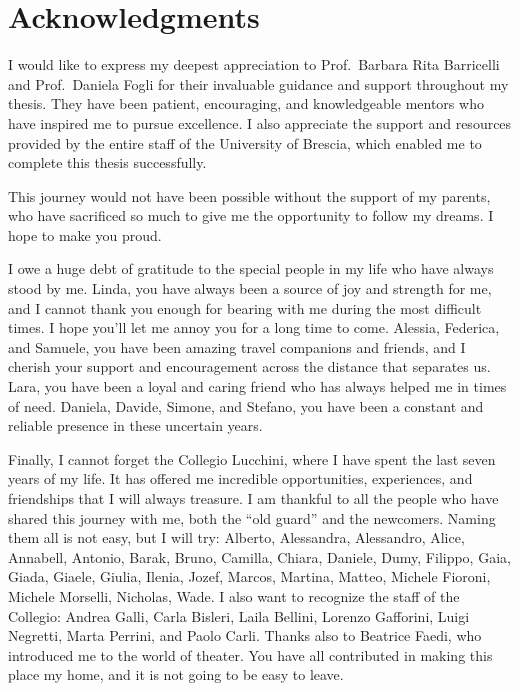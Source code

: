 \chapter*{Acknowledgments}\label{ch:acknowledgments}

I would like to express my deepest appreciation to Prof.\ Barbara Rita Barricelli and Prof.\ Daniela Fogli for their invaluable guidance and support throughout my thesis. They have been patient, encouraging, and knowledgeable mentors who have inspired me to pursue excellence. I also appreciate the support and resources provided by the entire staff of the University of Brescia, which enabled me to complete this thesis successfully.

This journey would not have been possible without the support of my parents, who have sacrificed so much to give me the opportunity to follow my dreams. I hope to make you proud.

I owe a huge debt of gratitude to the special people in my life who have always stood by me. Linda, you have always been a source of joy and strength for me, and I cannot thank you enough for bearing with me during the most difficult times. I hope you'll let me annoy you for a long time to come. Alessia, Federica, and Samuele, you have been amazing travel companions and friends, and I cherish your support and encouragement across the distance that separates us. Lara, you have been a loyal and caring friend who has always helped me in times of need. Daniela, Davide, Simone, and Stefano, you have been a constant and reliable presence in these uncertain years.

Finally, I cannot forget the Collegio Lucchini, where I have spent the last seven years of my life. It has offered me incredible opportunities, experiences, and friendships that I will always treasure. I am thankful to all the people who have shared this journey with me, both the “old guard” and the newcomers. Naming them all is not easy, but I will try: Alberto, Alessandra, Alessandro, Alice, Annabell, Antonio, Barak, Bruno, Camilla, Chiara, Daniele, Dumy, Filippo, Gaia, Giada, Giaele, Giulia, Ilenia, Jozef, Marcos, Martina, Matteo, Michele Fioroni, Michele Morselli, Nicholas, Wade. I also want to recognize the staff of the Collegio: Andrea Galli, Carla Bisleri, Laila Bellini, Lorenzo Gafforini, Luigi Negretti, Marta Perrini, and Paolo Carli. Thanks also to Beatrice Faedi, who introduced me to the world of theater. You have all contributed in making this place my home, and it is not going to be easy to leave.

